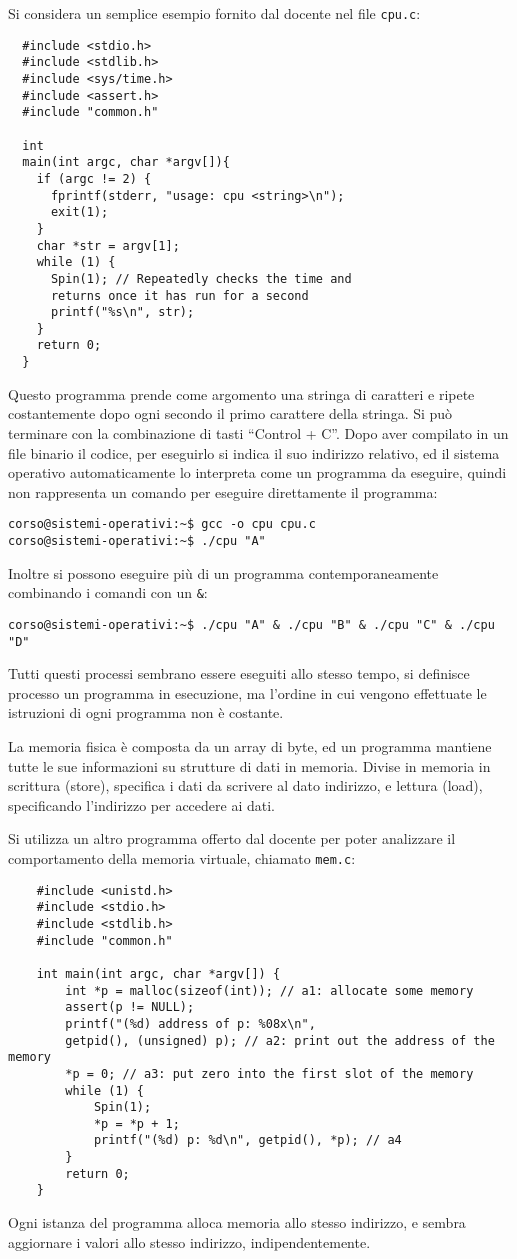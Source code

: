 \documentclass{article}
\numberwithin{equation}{subsection}
\begin{document}
Si considera un semplice esempio fornito dal docente nel file \verb|cpu.c|:
\begin{verbatim}
  #include <stdio.h>
  #include <stdlib.h>
  #include <sys/time.h>
  #include <assert.h>
  #include "common.h"

  int
  main(int argc, char *argv[]){
    if (argc != 2) {
      fprintf(stderr, "usage: cpu <string>\n");
      exit(1);
    }
    char *str = argv[1];
    while (1) {
      Spin(1); // Repeatedly checks the time and
      returns once it has run for a second
      printf("%s\n", str);
    }
    return 0;
  }
\end{verbatim}


Questo programma prende come argomento una stringa di caratteri e ripete costantemente dopo ogni secondo il primo carattere della stringa. Si può terminare con la 
combinazione di tasti ``Control + C''. Dopo aver compilato in un file binario il codice, per eseguirlo si indica il suo indirizzo relativo, ed il sistema operativo automaticamente lo interpreta come un 
programma da eseguire, quindi non rappresenta un comando per eseguire direttamente il programma:
\begin{verbatim}
corso@sistemi-operativi:~$ gcc -o cpu cpu.c 
corso@sistemi-operativi:~$ ./cpu "A"
\end{verbatim}

Inoltre si possono eseguire più di un programma contemporaneamente combinando i comandi con un \verb|&|:
\begin{verbatim}
corso@sistemi-operativi:~$ ./cpu "A" & ./cpu "B" & ./cpu "C" & ./cpu "D"
\end{verbatim}

Tutti questi processi sembrano essere eseguiti allo stesso tempo, si definisce processo un programma in esecuzione, ma l'ordine in cui vengono effettuate le 
istruzioni di ogni programma non è costante. 

La memoria fisica è composta da un array di byte, ed un programma mantiene tutte le sue informazioni su strutture di dati in memoria. Divise in memoria in scrittura 
(store), specifica i dati da scrivere al dato indirizzo, e lettura (load), specificando l'indirizzo per accedere ai dati. 

Si utilizza un altro programma offerto dal docente per poter analizzare il comportamento della memoria virtuale, chiamato \verb|mem.c|:
\begin{verbatim}
	#include <unistd.h>
	#include <stdio.h>
	#include <stdlib.h>
	#include "common.h"

	int main(int argc, char *argv[]) {
		int *p = malloc(sizeof(int)); // a1: allocate some memory
		assert(p != NULL);
		printf("(%d) address of p: %08x\n",
		getpid(), (unsigned) p); // a2: print out the address of the memory
		*p = 0; // a3: put zero into the first slot of the memory
		while (1) {
			Spin(1);
			*p = *p + 1;
			printf("(%d) p: %d\n", getpid(), *p); // a4
		}
		return 0;
	}
\end{verbatim}
Ogni istanza del programma alloca memoria allo stesso indirizzo, e sembra aggiornare i valori allo stesso indirizzo, indipendentemente. 
\end{document}
